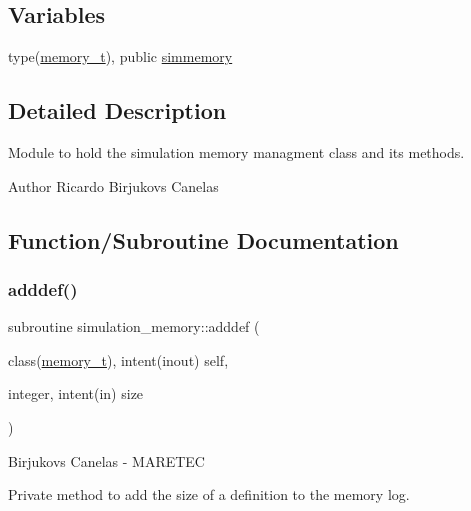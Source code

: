 \subsection*{Variables}
\begin{DoxyCompactItemize}
\item 
type(\hyperlink{structsimulation__memory_1_1memory__t}{memory\+\_\+t}), public \hyperlink{namespacesimulation__memory_a8ed2bc20b0c49405084442d02fc76d42}{simmemory}
\end{DoxyCompactItemize}


\subsection{Detailed Description}
Module to hold the simulation memory managment class and its methods. 

\begin{DoxyAuthor}{Author}
Ricardo Birjukovs Canelas 
\end{DoxyAuthor}


\subsection{Function/\+Subroutine Documentation}
\mbox{\label{namespacesimulation__memory_a62d5641dbec45bc279575c173b0f0f24}} 
\subsubsection{\texorpdfstring{adddef()}{adddef()}}
{\footnotesize\ttfamily subroutine simulation\+\_\+memory\+::adddef (\begin{DoxyParamCaption}\item[{class(\hyperlink{structsimulation__memory_1_1memory__t}{memory\+\_\+t}), intent(inout)}]{self,  }\item[{integer, intent(in)}]{size }\end{DoxyParamCaption})\hspace{0.3cm}{\ttfamily [private]}}



Birjukovs Canelas -\/ M\+A\+R\+E\+T\+EC 

Private method to add the size of a definition to the memory log. \mbox{\label{namespacesimulation__memory_acf01ce7bcb2d7571d37fb2c0338e5bd2}} 
